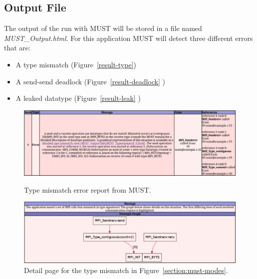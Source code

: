 \documentclass[english]{scrartcl}
\begin{document}
\subsection{Output File}

The output of the run with MUST will be stored in a file named
\emph{MUST\_Output.html}. For this application MUST will detect three different
errors that are:
\begin{itemize}
  \item A type mismatch (Figure~\ref{result-type})
  \item A send-send deadlock (Figure~\ref{result-deadlock} )
  \item A leaked datatype (Figure~\ref{result-leak} )   
\end{itemize}

\begin{figure}[t]
  \centering
  \includegraphics[angle=0,width=0.99\linewidth]{outputtypemismatch.pdf}
  \caption{Type mismatch error report from MUST.}
  \label{result-type}
  \includegraphics[angle=0,width=0.99\linewidth]{typemismatch.pdf}
  \caption{Detail page for the type mismatch in
  Figure~\ref{section:must-modes}.}
  \label{result-type-dot}
\end{figure}
% 
\end{document}
